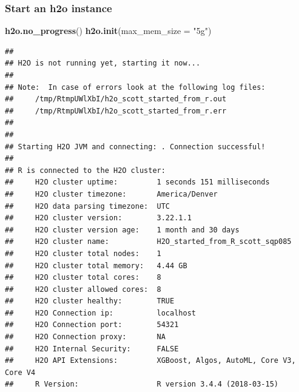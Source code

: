 \documentclass[]{article}
\newenvironment{Shaded}{\begin{snugshade}}{\end{snugshade}}
\newcommand{\KeywordTok}[1]{\textcolor[rgb]{0.13,0.29,0.53}{\textbf{#1}}}
\newcommand{\DataTypeTok}[1]{\textcolor[rgb]{0.13,0.29,0.53}{#1}}
\newcommand{\StringTok}[1]{\textcolor[rgb]{0.31,0.60,0.02}{#1}}
\newcommand{\NormalTok}[1]{#1}
\begin{document}
\subsubsection{Start an h2o instance}\label{start-an-h2o-instance}

\begin{Shaded}
\begin{Highlighting}[]
\KeywordTok{h2o.no_progress}\NormalTok{()}
\KeywordTok{h2o.init}\NormalTok{(}\DataTypeTok{max_mem_size =} \StringTok{"5g"}\NormalTok{)}
\end{Highlighting}
\end{Shaded}

\begin{verbatim}
## 
## H2O is not running yet, starting it now...
## 
## Note:  In case of errors look at the following log files:
##     /tmp/RtmpUWlXbI/h2o_scott_started_from_r.out
##     /tmp/RtmpUWlXbI/h2o_scott_started_from_r.err
## 
## 
## Starting H2O JVM and connecting: . Connection successful!
## 
## R is connected to the H2O cluster: 
##     H2O cluster uptime:         1 seconds 151 milliseconds 
##     H2O cluster timezone:       America/Denver 
##     H2O data parsing timezone:  UTC 
##     H2O cluster version:        3.22.1.1 
##     H2O cluster version age:    1 month and 30 days  
##     H2O cluster name:           H2O_started_from_R_scott_sqp085 
##     H2O cluster total nodes:    1 
##     H2O cluster total memory:   4.44 GB 
##     H2O cluster total cores:    8 
##     H2O cluster allowed cores:  8 
##     H2O cluster healthy:        TRUE 
##     H2O Connection ip:          localhost 
##     H2O Connection port:        54321 
##     H2O Connection proxy:       NA 
##     H2O Internal Security:      FALSE 
##     H2O API Extensions:         XGBoost, Algos, AutoML, Core V3, Core V4 
##     R Version:                  R version 3.4.4 (2018-03-15)
\end{verbatim}
\end{document}
